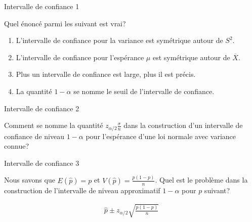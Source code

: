 \documentclass{BeamerTemplate}
\begin{document}
\begin{frame}{Intervalle de confiance 1}\label{ic1}
\begin{center}

Quel énoncé parmi les suivant est vrai?

\medskip
\begin{enumerate}
    \item L'intervalle de confiance pour la variance est symétrique autour de $S^2$.
    \item L'intervalle de confiance pour l'espérance $\mu$ est symétrique autour de $\overline{X}$.
    \item Plus un intervalle de confiance est large, plus il est précis.
    \item La quantité $1-\alpha$ se nomme le seuil de l'intervalle de confiance.
\end{enumerate}

\end{center}

\end{frame}

\begin{frame}{Intervalle de confiance 2}\label{ic2}
\begin{center}

Comment se nomme la quantité $z_{\alpha/2}\frac{\sigma}{n}$ dans la construction d'un intervalle de confiance de niveau $1-\alpha$ pour l'espérance d'une loi normale avec variance connue?

\end{center}

\end{frame}

\begin{frame}{Intervalle de confiance 3}\label{ic3}
\begin{center}

Nous savons que $E(\widehat{p})=p$ et $\displaystyle V(\widehat{p})=\frac{p(1-p)}{n}$. Quel est le problème dans la construction de l'intervalle de niveau approximatif $1-\alpha$ pour $p$ suivant?

\begin{align*}
    \widehat{p}\pm z_{\alpha/2}\sqrt{\frac{p(1-p)}{n}}
\end{align*}

\end{center}

\end{frame}
\end{document}
